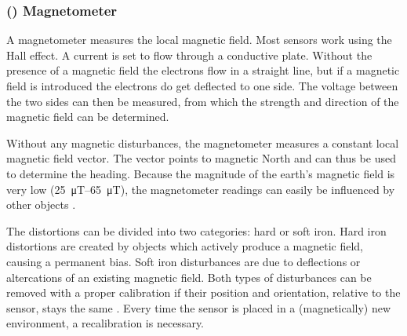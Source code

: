 \subsubsection{() Magnetometer}
A magnetometer measures the local magnetic field.
Most sensors work using the Hall effect.
A current is set to flow through a conductive plate.
Without the presence of a magnetic field the electrons flow in a straight line, but if a magnetic field is introduced the electrons do get deflected to one side.
The voltage between the two sides can then be measured, from which the strength and direction of the magnetic field can be determined.\par
Without any magnetic disturbances, the magnetometer measures a constant local magnetic field vector.
The vector points to magnetic North and can thus be used to determine the heading.
Because the magnitude of the earth's magnetic field is very low (\SIrange{25}{65}{\micro\tesla}), the magnetometer readings can easily be influenced by other objects \cite{Kok2016}.\par
The distortions can be divided into two categories: hard or soft iron.
Hard iron distortions are created by objects which actively produce a magnetic field, causing a permanent bias.
Soft iron disturbances are due to deflections or altercations of an existing magnetic field.
Both types of disturbances can be removed with a proper calibration if their position and orientation, relative to the sensor, stays the same \cite{Guo2008}.
Every time the sensor is placed in a (magnetically) new environment, a recalibration is necessary.

